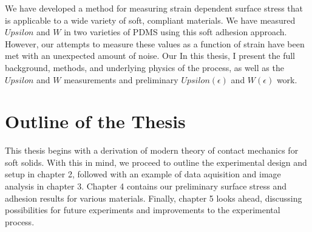 We have developed a method for measuring strain dependent surface stress that is applicable to a wide variety of soft, compliant materials. We have measured $ Upsilon $ and $ W $ in two varieties of PDMS using this soft adhesion approach. However, our attempts to measure these values as a function of strain have been met with an unexpected amount of noise.   Our In this thesis, I present the full background, methods, and underlying physics of the process, as well as the $ Upsilon $ and $ W $ measurements and preliminary $ Upsilon(\epsilon) $ and $ W(\epsilon) $ work.  



 




\section{Outline of the Thesis}
This thesis begins with a derivation of modern theory of contact mechanics for soft solids. With this in mind, we proceed to outline the experimental design and setup in chapter 2, followed with an example of data aquisition and image analysis in chapter 3. Chapter 4 contains our preliminary surface stress and adhesion results for various materials. Finally, chapter 5 looks ahead, discussing possibilities for future experiments and improvements to the experimental process.